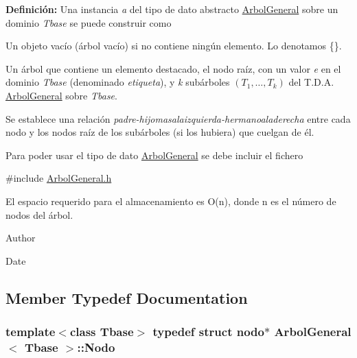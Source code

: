 {\bfseries Definición\+:} Una instancia {\itshape a} del tipo de dato abstracto \hyperlink{class_arbol_general}{Arbol\+General} sobre un dominio {\itshape Tbase} se puede construir como


\begin{DoxyItemize}
\item Un objeto vacío (árbol vacío) si no contiene ningún elemento. Lo denotamos \{\}.
\item Un árbol que contiene un elemento destacado, el nodo raíz, con un valor {\itshape e} en el dominio {\itshape Tbase} (denominado {\itshape etiqueta}), y {\itshape k} subárboles $(T_1, \ldots, T_k)$ del T.\+D.\+A. \hyperlink{class_arbol_general}{Arbol\+General} sobre {\itshape Tbase}.
\end{DoxyItemize}

Se establece una relación {\itshape padre-\/hijomasalaizquierda-\/hermanoaladerecha} entre cada nodo y los nodos raíz de los subárboles (si los hubiera) que cuelgan de él.

Para poder usar el tipo de dato \hyperlink{class_arbol_general}{Arbol\+General} se debe incluir el fichero

{\ttfamily \#include \hyperlink{_arbol_general_8h_source}{Arbol\+General.\+h}}

El espacio requerido para el almacenamiento es O(n), donde n es el número de nodos del árbol.

\begin{DoxyAuthor}{Author}

\end{DoxyAuthor}
\begin{DoxyDate}{Date}

\end{DoxyDate}


\subsection{Member Typedef Documentation}
\subsubsection[{\texorpdfstring{Nodo}{Nodo}}]{\setlength{\rightskip}{0pt plus 5cm}template$<$class Tbase$>$ typedef struct nodo$\ast$ {\bf Arbol\+General}$<$ Tbase $>$\+::{\bf Nodo}}\hypertarget{class_arbol_general_a12cc1b74a9095d89bc7334290d332f7a}{}\label{class_arbol_general_a12cc1b74a9095d89bc7334290d332f7a}


